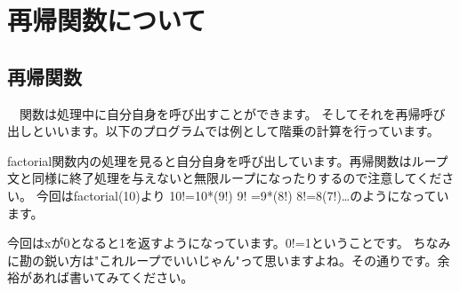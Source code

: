 ﻿\section{再帰関数について}
\subsection{再帰関数}

　関数は処理中に自分自身を呼び出すことができます。
そしてそれを再帰呼び出しといいます。以下のプログラムでは例として階乗の計算を行っています。

factorial関数内の処理を見ると自分自身を呼び出しています。再帰関数はループ文と同様に終了処理を与えないと無限ループになったりするので注意してください。
今回はfactorial(10)より
10!=10*(9!)   9! =9*(8!)    8!=8(7!)…のようになっています。

今回はxが0となると1を返すようになっています。0!=1ということです。
ちなみに勘の鋭い方は"これループでいいじゃん"って思いますよね。その通りです。余裕があれば書いてみてください。
